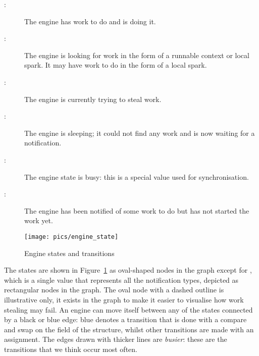 \begin{description}
    \item[:] The engine has work to do and is doing it.

    \item[:] The engine is looking for work in
        the form of a runnable context or local spark.  It may have work to
        do in the form of a local spark.

    \item[:] The engine is currently trying to steal work.

    \item[:] The engine is sleeping; it could not find any
        work and is now waiting for a notification.

    \item[:] The engine state is busy: this is a special value
        used for synchronisation.

    \item[:] The engine has been notified of some work to
        do but has not started the work yet.
\end{description}

\begin{figure}
\begin{center}
\texttt{[image: pics/engine\_state]}
\end{center}
\caption{Engine states and transitions}
\label{fig:engine_states}
\end{figure}

\noindent
The states are shown in Figure~\ref{fig:engine_states} as oval-shaped nodes
in the graph except for ,
which is a single value that represents all the notification types,
depicted as rectangular nodes in the graph.
The oval node with a dashed outline is illustrative only,
it exists in the graph to make it easier to visualise how work stealing may
fail.
An engine can move itself between any of the states connected by a black or
blue edge:
blue denotes a transition that is done with a compare and swap on the
 field of the \enginesleepsync structure,
whilst other transitions are made with an assignment.
The edges drawn with thicker lines are \emph{busier}:
these are the transitions that we think occur most often.

